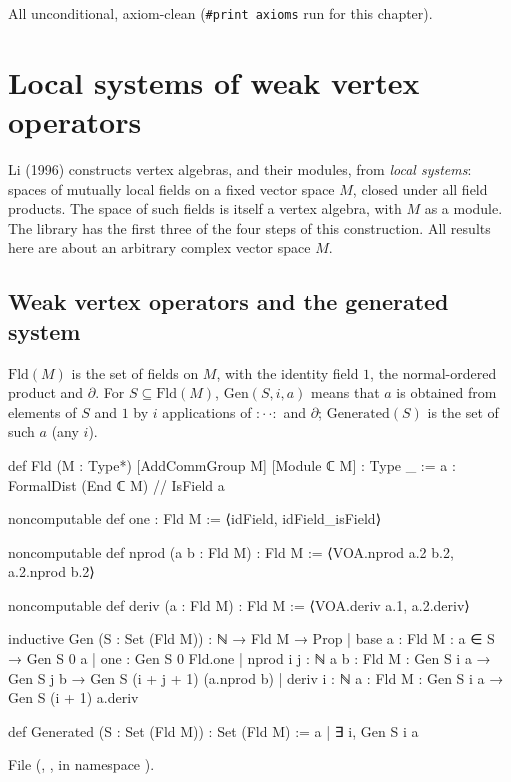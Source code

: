 \begin{status}
All unconditional, axiom-clean (\texttt{\#print axioms}  run for this chapter).
\end{status}

\section{Local systems of weak vertex operators}\label{l03:sec:local}

Li (1996) constructs vertex algebras, and their modules, from \emph{local systems}: spaces of
mutually local fields on a fixed vector space $M$, closed under all field products. The space of
such fields is itself a vertex algebra, with $M$ as a module. The library has the first three of
the four steps of this construction. All results here are about an arbitrary complex vector space
$M$.

\subsection{Weak vertex operators and the generated system}

\begin{definition}\label{l03:def:fld}
$\mathrm{Fld}(M)$ is the set of fields on $M$, with the identity field $1$, the normal-ordered product
and $\partial$. For $S\subseteq\mathrm{Fld}(M)$, $\mathrm{Gen}(S,i,a)$ means that $a$ is obtained from
elements of $S$ and $1$ by $i$ applications of ${:}\cdot\,\cdot{:}$ and $\partial$; $\mathrm{Generated}(S)$ is
the set of such $a$ (any $i$).
\end{definition}
\begin{leancode}
def Fld (M : Type*) [AddCommGroup M] [Module ℂ M] : Type _ :=
  {a : FormalDist (End ℂ M) // IsField a}

noncomputable def one : Fld M := ⟨idField, idField_isField⟩

noncomputable def nprod (a b : Fld M) : Fld M :=
  ⟨VOA.nprod a.2 b.2, a.2.nprod b.2⟩

noncomputable def deriv (a : Fld M) : Fld M :=
  ⟨VOA.deriv a.1, a.2.deriv⟩

inductive Gen (S : Set (Fld M)) : ℕ → Fld M → Prop
  | base {a : Fld M} : a ∈ S → Gen S 0 a
  | one : Gen S 0 Fld.one
  | nprod {i j : ℕ} {a b : Fld M} : Gen S i a → Gen S j b → Gen S (i + j + 1) (a.nprod b)
  | deriv {i : ℕ} {a : Fld M} : Gen S i a → Gen S (i + 1) a.deriv

def Generated (S : Set (Fld M)) : Set (Fld M) := {a | ∃ i, Gen S i a}
\end{leancode}
File  (, ,
 in namespace ).

